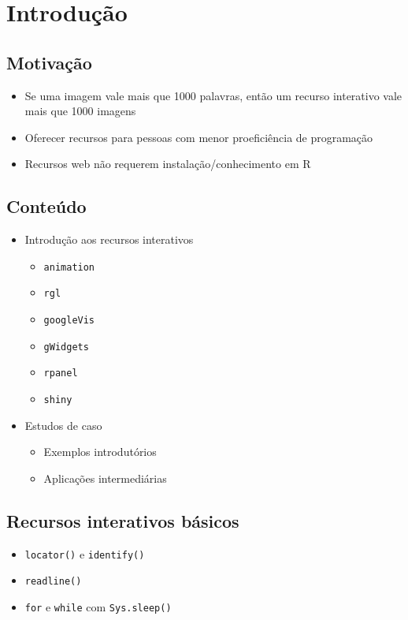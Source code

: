 \section{Introdução}

\subsection{Motivação}

\begin{frame}

  \begin{itemize}
  \item Se uma imagem vale mais que 1000 palavras, então um recurso
    interativo vale mais que 1000 imagens
  \item Oferecer recursos para pessoas com menor proeficiência de
    programação
  \item Recursos web não requerem instalação/conhecimento em R
  \end{itemize}

\end{frame}

\subsection{Conteúdo}

\begin{frame}

  \begin{itemize}
  \item Introdução aos recursos interativos
  
  \begin{itemize}
  \item \texttt{animation}
  \item \texttt{rgl}
  \item \texttt{googleVis}
  \item \texttt{gWidgets}
  \item \texttt{rpanel}
  \item \texttt{shiny}
  \end{itemize}
\item Estudos de caso

  \begin{itemize}
  \item Exemplos introdutórios
  \item Aplicações intermediárias
  \end{itemize}
\end{itemize}

\end{frame}

\subsection{Recursos interativos básicos}

\begin{frame}

  \begin{itemize}
  \item \texttt{locator()} e \texttt{identify()}
  \item \texttt{readline()}
  \item \texttt{for} e \texttt{while} com \texttt{Sys.sleep()}
  \end{itemize}

\end{frame}
